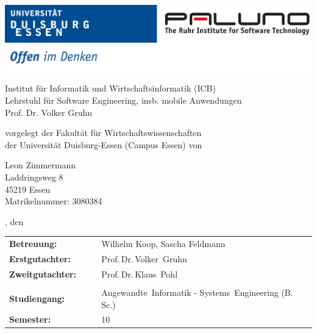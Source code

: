 \pagestyle{empty} %

\includegraphics[width=\textwidth]{./img/logo_unidue_paluno_deutsch.pdf}

\begin{sffamily}

\begin{center}

\vspace*{0.7cm}

\normalsize{Institut für Informatik und Wirtschaftsinformatik (ICB)\\%
Lehrstuhl für Software Engineering, insb. mobile Anwendungen\\
Prof. Dr. Volker Gruhn}


\vspace*{2.5cm}

\LARGE{\documentHeading}

\vspace*{1cm}

\large{\documentType}

\vspace*{2.5cm}

\normalsize{vorgelegt der Fakultät für Wirtschaftswissenschaften\\
der Universität Duisburg-Essen (Campus Essen) von}

\vspace*{\baselineskip}

\normalsize{
Leon Zimmermann \\
Laddringsweg 8 \\
45219 Essen \\
Matrikelnummer: 3080384
}

\vspace*{1.5cm}

\small{\documentLocation, den \documentDate}

\vspace*{1.5cm}

\normalsize{
\begin{tabular*}{\linewidth}{p{0.3\linewidth}p{0.7\linewidth}}
\textbf{Betreuung:}      & Wilhelm Koop, Sascha Feldmann\\
\textbf{Erstgutachter:}  & Prof.\,Dr.\,Volker~Gruhn\\
\textbf{Zweitgutachter:} & Prof.\,Dr.\,Klaus~Pohl\\
\\
\textbf{Studiengang:}    & Angewandte~Informatik - Systems~Engineering (B.\,Sc.)\\
\textbf{Semester:}       & 10
\end{tabular*}
}

\end{center}

\end{sffamily}
\clearpage
